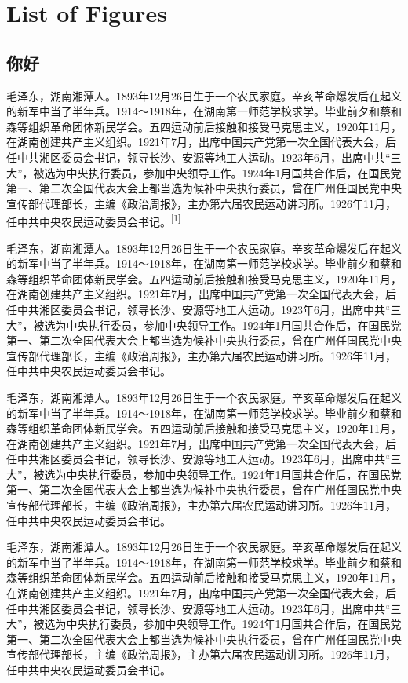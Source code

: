 \documentclass[]{article}
\begin{document}
\section{List of Figures}

\subsection{你好}

毛泽东，湖南湘潭人。1893年12月26日生于一个农民家庭。辛亥革命爆发后在起义的新军中当了半年兵。1914～1918年，在湖南第一师范学校求学。毕业前夕和蔡和森等组织革命团体新民学会。五四运动前后接触和接受马克思主义，1920年11月，在湖南创建共产主义组织。1921年7月，出席中国共产党第一次全国代表大会，后任中共湘区委员会书记，领导长沙、安源等地工人运动。1923年6月，出席中共``三大''，被选为中央执行委员，参加中央领导工作。1924年1月国共合作后，在国民党第一、第二次全国代表大会上都当选为候补中央执行委员，曾在广州任国民党中央宣传部代理部长，主编《政治周报》，主办第六届农民运动讲习所。1926年11月，任中共中央农民运动委员会书记。\textsuperscript{{[}1{]}}

毛泽东，湖南湘潭人。1893年12月26日生于一个农民家庭。辛亥革命爆发后在起义的新军中当了半年兵。1914～1918年，在湖南第一师范学校求学。毕业前夕和蔡和森等组织革命团体新民学会。五四运动前后接触和接受马克思主义，1920年11月，在湖南创建共产主义组织。1921年7月，出席中国共产党第一次全国代表大会，后任中共湘区委员会书记，领导长沙、安源等地工人运动。1923年6月，出席中共``三大''，被选为中央执行委员，参加中央领导工作。1924年1月国共合作后，在国民党第一、第二次全国代表大会上都当选为候补中央执行委员，曾在广州任国民党中央宣传部代理部长，主编《政治周报》，主办第六届农民运动讲习所。1926年11月，任中共中央农民运动委员会书记。

毛泽东，湖南湘潭人。1893年12月26日生于一个农民家庭。辛亥革命爆发后在起义的新军中当了半年兵。1914～1918年，在湖南第一师范学校求学。毕业前夕和蔡和森等组织革命团体新民学会。五四运动前后接触和接受马克思主义，1920年11月，在湖南创建共产主义组织。1921年7月，出席中国共产党第一次全国代表大会，后任中共湘区委员会书记，领导长沙、安源等地工人运动。1923年6月，出席中共``三大''，被选为中央执行委员，参加中央领导工作。1924年1月国共合作后，在国民党第一、第二次全国代表大会上都当选为候补中央执行委员，曾在广州任国民党中央宣传部代理部长，主编《政治周报》，主办第六届农民运动讲习所。1926年11月，任中共中央农民运动委员会书记。

毛泽东，湖南湘潭人。1893年12月26日生于一个农民家庭。辛亥革命爆发后在起义的新军中当了半年兵。1914～1918年，在湖南第一师范学校求学。毕业前夕和蔡和森等组织革命团体新民学会。五四运动前后接触和接受马克思主义，1920年11月，在湖南创建共产主义组织。1921年7月，出席中国共产党第一次全国代表大会，后任中共湘区委员会书记，领导长沙、安源等地工人运动。1923年6月，出席中共``三大''，被选为中央执行委员，参加中央领导工作。1924年1月国共合作后，在国民党第一、第二次全国代表大会上都当选为候补中央执行委员，曾在广州任国民党中央宣传部代理部长，主编《政治周报》，主办第六届农民运动讲习所。1926年11月，任中共中央农民运动委员会书记。
\end{document}
